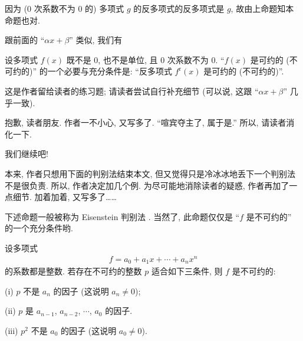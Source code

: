 \begin{pf}
    因为 ($0$ 次系数不为 $0$ 的) 多项式 $g$ 的反多项式的反多项式是 $g$, 故由上命题知本命题也对.
\end{pf}

跟前面的 ``$\alpha x + \beta$'' 类似, 我们有
\begin{proposition}
    设多项式 $f(x)$ 既不是 $0$, 也不是单位, 且 $0$ 次系数不为 $0$. ``$f(x)$ 是可约的 (不可约的)'' 的一个必要与充分条件是: ``反多项式 $f^{\mathrm{r}} (x)$ 是可约的 (不可约的)''.
\end{proposition}

\begin{pf}
    这是作者留给读者的练习题; 请读者尝试自行补充细节 (可以说, 这跟 ``$\alpha x + \beta$'' 几乎一致).
\end{pf}

抱歉, 读者朋友. 作者一不小心, 又写多了. ``喧宾夺主了, 属于是.'' 所以, 请读者消化一下.

\myLine

我们继续吧!

本来, 作者只想用下面的判别法结束本文, 但又觉得只是冷冰冰地丢下一个判别法不是很负责. 所以, 作者决定加几个例. 为尽可能地消除读者的疑惑, 作者再加了一点细节. 加着加着, 又写多了……

下述命题一般被称为 Eisenstein 判别法 . 当然了, 此命题仅仅是 ``$f$ 是不可约的'' 的一个充分条件哟.

\begin{proposition}
    设多项式
    \begin{align*}
        f = a_0 + a_1 x + \cdots + a_n x^n
    \end{align*}
    的系数都是整数. 若存在不可约的整数 $p$ 适合如下三条件, 则 $f$ 是不可约的:

    (i) $p$ 不是 $a_n$ 的因子 (这说明 $a_n \neq 0$);

    (ii) $p$ 是 $a_{n-1}$, $a_{n-2}$, $\cdots$, $a_0$ 的因子.

    (iii) $p^2$ 不是 $a_0$ 的因子 (这说明 $a_0 \neq 0$).
\end{proposition}

